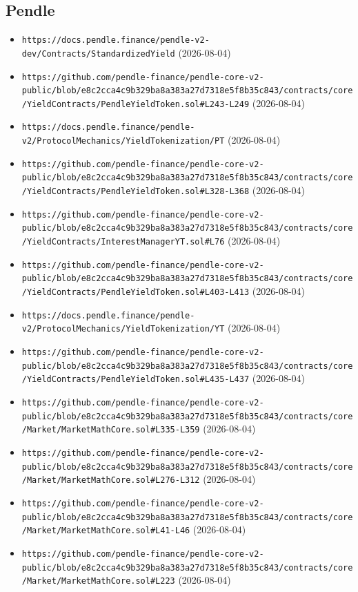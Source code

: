 \subsection*{Pendle}
\begin{itemize}\setlength{\itemsep}{0pt}\small
\item \texttt{https://docs.pendle.finance/pendle-v2-dev/Contracts/StandardizedYield} (2026-08-04)
\item \texttt{https://github.com/pendle-finance/pendle-core-v2-public/blob/e8c2cca4c9b329ba8a383a27d7318e5f8b35c843/contracts/core/YieldContracts/PendleYieldToken.sol\#L243-L249} (2026-08-04)
\item \texttt{https://docs.pendle.finance/pendle-v2/ProtocolMechanics/YieldTokenization/PT} (2026-08-04)
\item \texttt{https://github.com/pendle-finance/pendle-core-v2-public/blob/e8c2cca4c9b329ba8a383a27d7318e5f8b35c843/contracts/core/YieldContracts/PendleYieldToken.sol\#L328-L368} (2026-08-04)
\item \texttt{https://github.com/pendle-finance/pendle-core-v2-public/blob/e8c2cca4c9b329ba8a383a27d7318e5f8b35c843/contracts/core/YieldContracts/InterestManagerYT.sol\#L76} (2026-08-04)
\item \texttt{https://github.com/pendle-finance/pendle-core-v2-public/blob/e8c2cca4c9b329ba8a383a27d7318e5f8b35c843/contracts/core/YieldContracts/PendleYieldToken.sol\#L403-L413} (2026-08-04)
\item \texttt{https://docs.pendle.finance/pendle-v2/ProtocolMechanics/YieldTokenization/YT} (2026-08-04)
\item \texttt{https://github.com/pendle-finance/pendle-core-v2-public/blob/e8c2cca4c9b329ba8a383a27d7318e5f8b35c843/contracts/core/YieldContracts/PendleYieldToken.sol\#L435-L437} (2026-08-04)
\item \texttt{https://github.com/pendle-finance/pendle-core-v2-public/blob/e8c2cca4c9b329ba8a383a27d7318e5f8b35c843/contracts/core/Market/MarketMathCore.sol\#L335-L359} (2026-08-04)
\item \texttt{https://github.com/pendle-finance/pendle-core-v2-public/blob/e8c2cca4c9b329ba8a383a27d7318e5f8b35c843/contracts/core/Market/MarketMathCore.sol\#L276-L312} (2026-08-04)
\item \texttt{https://github.com/pendle-finance/pendle-core-v2-public/blob/e8c2cca4c9b329ba8a383a27d7318e5f8b35c843/contracts/core/Market/MarketMathCore.sol\#L41-L46} (2026-08-04)
\item \texttt{https://github.com/pendle-finance/pendle-core-v2-public/blob/e8c2cca4c9b329ba8a383a27d7318e5f8b35c843/contracts/core/Market/MarketMathCore.sol\#L223} (2026-08-04)

\end{itemize}
